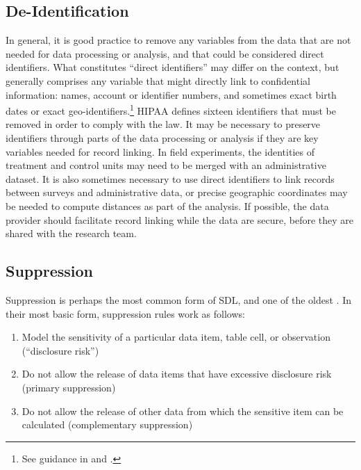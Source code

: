 \documentclass[
]{book}
\providecommand{\tightlist}{%
  \setlength{\itemsep}{0pt}\setlength{\parskip}{0pt}}
\begin{document}
\hypertarget{de-identification}{%
\subsection{De-Identification}\label{de-identification}}

In general, it is good practice to remove any variables from the data that are not needed for data processing or analysis, and that could be considered direct identifiers. What constitutes ``direct identifiers'' may differ on the context, but generally comprises any variable that might directly link to confidential information: names, account or identifier numbers, and sometimes exact birth dates or exact geo-identifiers.\footnote{See guidance in \citet{world_bank_dime_nodate} and \citet{kopper_j-pal_2020}.} HIPAA defines sixteen identifiers that must be removed in order to comply with the law. It may be necessary to preserve identifiers through parts of the data processing or analysis if they are key variables needed for record linking. In field experiments, the identities of treatment and control units may need to be merged with an administrative dataset. It is also sometimes necessary to use direct identifiers to link records between surveys and administrative data, or precise geographic coordinates may be needed to compute distances as part of the analysis. If possible, the data provider should facilitate record linking while the data are secure, before they are shared with the research team.

\hypertarget{suppression}{%
\subsection{Suppression}\label{suppression}}

Suppression is perhaps the most common form of SDL, and one of the oldest \citep{fellegi_question_1972}. In their most basic form, suppression rules work as follows:

\begin{enumerate}
\def\labelenumi{\arabic{enumi}.}
\tightlist
\item
  Model the sensitivity of a particular data item, table cell, or observation (``disclosure risk'')
\item
  Do not allow the release of data items that have excessive disclosure risk (primary suppression)
\item
  Do not allow the release of other data from which the sensitive item can be calculated (complementary suppression)
\end{enumerate}
\end{document}
